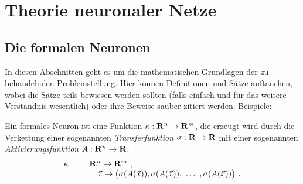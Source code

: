 \chapter{Theorie neuronaler Netze}
\label{chap:theorie}

\section{Die formalen Neuronen}
In diesen Abschnitten geht es um die mathematischen Grundlagen der zu
behandelnden Problemstellung. Hier können Definitionen und Sätze
auftauchen, wobei die Sätze teils bewiesen werden sollten (falls einfach
und für das weitere Verständnis wesentlich) oder ihre Beweise sauber
zitiert werden. Beispiele: \\
\begin{definition}
Ein formales Neuron ist eine Funktion
$\kappa: \mathbf{R}^n \to \mathbf{R}^m$, die erzeugt wird durch die Verkettung 
einer sogenannten {\sl Transferfunktion} 
$\sigma: \mathbf{R} \to \mathbf{R}$ mit einer sogenannten
{\sl Aktivierungsfunktion} $A: \mathbf{R}^n \to \mathbf{R}$:
\begin{equation}
\begin{array}{rl}
\kappa: \ \ \ & \mathbf{R}^n \to \mathbf{R}^m \ , \\
        & \ \ \ \vec x \mapsto 
        \big( \sigma(A(\vec x)), \sigma(A(\vec x)), \ \ldots \ ,
                               \sigma(A(\vec x)) \big) \ . 
\end{array} 
\end{equation}			       
\end{definition}

